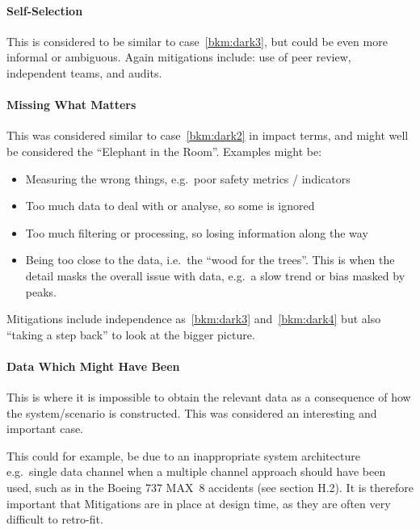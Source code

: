 \paragraph{Self-Selection}\label{bkm:dark4}
This is considered to be similar to case~\ref{bkm:dark3}, but could be even more informal or ambiguous. Again mitigations include: use of peer review, independent teams, and audits.

\paragraph{Missing What Matters}\label{bkm:dark5}
This was considered similar to case~\ref{bkm:dark2} in impact terms, and might well be considered the “Elephant in the Room”. Examples might be:
\begin{itemize}
\item Measuring the wrong things, e.g.\ poor safety metrics / indicators
  \item Too much data to deal with or analyse, so some is ignored
  \item Too much filtering or processing, so losing \gls{information} along the way
  \item Being too close to the data, i.e.\ the “wood for the trees”. This is when the detail masks the overall issue with data, e.g.\ a slow trend or bias masked by peaks.
\end{itemize}

Mitigations include independence as~\ref{bkm:dark3} and~\ref{bkm:dark4} but also “taking a step back” to look at the bigger picture.

\paragraph{Data Which Might Have Been}\label{bkm:dark6}
This is where it is impossible to obtain the relevant data as a consequence of how the system/scenario is constructed. This was considered an interesting and important case.

This could for example, be due to an inappropriate system architecture e.g.\ single data channel when a multiple channel approach should have been used, such as in the Boeing 737 MAX~8 accidents (see section H.2). It is therefore important that Mitigations are in place at design time, as they are often very difficult to retro-fit.

